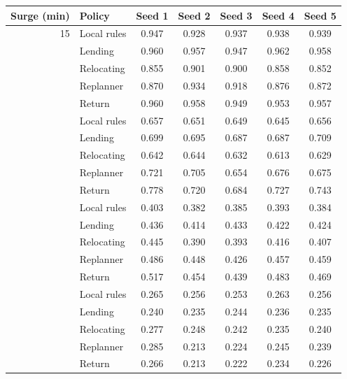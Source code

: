 \begin{tabular}{@{}rlccccc@{}}
\toprule
Surge (min) & Policy & Seed 1 & Seed 2 & Seed 3 & Seed 4 & Seed 5 \\
\midrule
15 & Local rules & 0.947 & 0.928 & 0.937 & 0.938 & 0.939 \\
 & Lending & 0.960 & 0.957 & 0.947 & 0.962 & 0.958 \\
 & Relocating & 0.855 & 0.901 & 0.900 & 0.858 & 0.852 \\
 & Replanner & 0.870 & 0.934 & 0.918 & 0.876 & 0.872 \\
 & Return & 0.960 & 0.958 & 0.949 & 0.953 & 0.957 \\
\addlinespace
60 & Local rules & 0.657 & 0.651 & 0.649 & 0.645 & 0.656 \\
 & Lending & 0.699 & 0.695 & 0.687 & 0.687 & 0.709 \\
 & Relocating & 0.642 & 0.644 & 0.632 & 0.613 & 0.629 \\
 & Replanner & 0.721 & 0.705 & 0.654 & 0.676 & 0.675 \\
 & Return & 0.778 & 0.720 & 0.684 & 0.727 & 0.743 \\
\addlinespace
120 & Local rules & 0.403 & 0.382 & 0.385 & 0.393 & 0.384 \\
 & Lending & 0.436 & 0.414 & 0.433 & 0.422 & 0.424 \\
 & Relocating & 0.445 & 0.390 & 0.393 & 0.416 & 0.407 \\
 & Replanner & 0.486 & 0.448 & 0.426 & 0.457 & 0.459 \\
 & Return & 0.517 & 0.454 & 0.439 & 0.483 & 0.469 \\
\addlinespace
240 & Local rules & 0.265 & 0.256 & 0.253 & 0.263 & 0.256 \\
 & Lending & 0.240 & 0.235 & 0.244 & 0.236 & 0.235 \\
 & Relocating & 0.277 & 0.248 & 0.242 & 0.235 & 0.240 \\
 & Replanner & 0.285 & 0.213 & 0.224 & 0.245 & 0.239 \\
 & Return & 0.266 & 0.213 & 0.222 & 0.234 & 0.226 \\
\bottomrule
\end{tabular}
